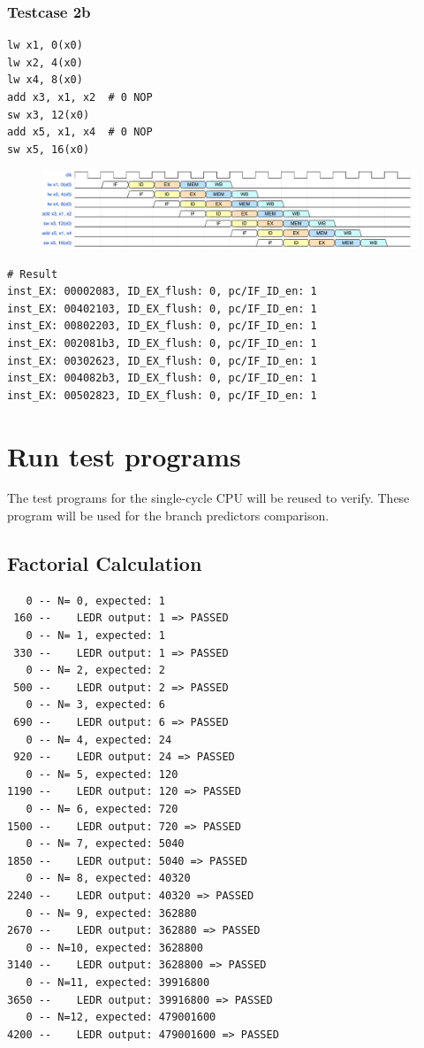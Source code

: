 \documentclass[12pt,a4paper,oneside]{book} %
\begin{document}
\subsubsection*{Testcase 2b}
\begin{verbatim}
lw x1, 0(x0)
lw x2, 4(x0)
lw x4, 8(x0)
add x3, x1, x2  # 0 NOP
sw x3, 12(x0)
add x5, x1, x4  # 0 NOP
sw x5, 16(x0)
\end{verbatim}

\begin{figure}[H]
    \centering
    \includegraphics[scale=0.525]{images/tb/hd_case2b.pdf}
\end{figure}

\begin{verbatim}
# Result
inst_EX: 00002083, ID_EX_flush: 0, pc/IF_ID_en: 1
inst_EX: 00402103, ID_EX_flush: 0, pc/IF_ID_en: 1
inst_EX: 00802203, ID_EX_flush: 0, pc/IF_ID_en: 1
inst_EX: 002081b3, ID_EX_flush: 0, pc/IF_ID_en: 1
inst_EX: 00302623, ID_EX_flush: 0, pc/IF_ID_en: 1
inst_EX: 004082b3, ID_EX_flush: 0, pc/IF_ID_en: 1
inst_EX: 00502823, ID_EX_flush: 0, pc/IF_ID_en: 1
\end{verbatim}


\section{Run test programs}
The test programs for the single-cycle CPU will be reused to verify. These program will be used for the branch predictors comparison.
\subsection{Factorial Calculation}
\begin{verbatim}
   0 -- N= 0, expected: 1
 160 --    LEDR output: 1 => PASSED
   0 -- N= 1, expected: 1
 330 --    LEDR output: 1 => PASSED
   0 -- N= 2, expected: 2
 500 --    LEDR output: 2 => PASSED
   0 -- N= 3, expected: 6
 690 --    LEDR output: 6 => PASSED
   0 -- N= 4, expected: 24
 920 --    LEDR output: 24 => PASSED
   0 -- N= 5, expected: 120
1190 --    LEDR output: 120 => PASSED
   0 -- N= 6, expected: 720
1500 --    LEDR output: 720 => PASSED
   0 -- N= 7, expected: 5040
1850 --    LEDR output: 5040 => PASSED
   0 -- N= 8, expected: 40320
2240 --    LEDR output: 40320 => PASSED
   0 -- N= 9, expected: 362880
2670 --    LEDR output: 362880 => PASSED
   0 -- N=10, expected: 3628800
3140 --    LEDR output: 3628800 => PASSED
   0 -- N=11, expected: 39916800
3650 --    LEDR output: 39916800 => PASSED
   0 -- N=12, expected: 479001600
4200 --    LEDR output: 479001600 => PASSED
\end{verbatim}
\end{document}
